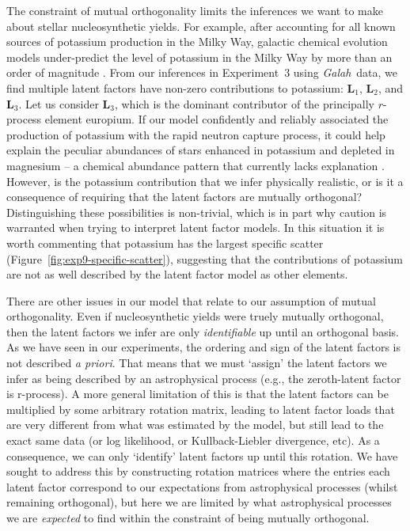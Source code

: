 \documentclass[twocolumn]{aastex62}
\newcommand{\project}[1]{\textsl{#1}}
\newcommand{\Galah}{\project{Galah}}
\newcommand{\factorloads}{\textbf{L}}
\begin{document}
The constraint of mutual orthogonality limits the inferences we want to make
about stellar nucleosynthetic yields. For example, after accounting for all
known sources of potassium production in the Milky Way, galactic chemical evolution
models under-predict the level of potassium in the Milky Way by more than an
order of magnitude \citep{Kobayashi:2006}. From our inferences in Experiment~3
using \Galah\ data, we find multiple latent factors have non-zero contributions
to potassium: $\factorloads_1$, $\factorloads_2$, and $\factorloads_3$. Let us consider
$\factorloads_3$, which is the dominant contributor of the principally $r$-process element europium. If our model confidently and
reliably associated the production of potassium with the rapid neutron capture
process, it could help explain the peculiar abundances of stars enhanced in
potassium and depleted in magnesium \citep{Mucciarelli:2012,Cohen:2012} -- a chemical
abundance pattern that currently lacks explanation \citep{Kemp:2018}.
However, is the potassium contribution that we infer physically realistic,
or is it a consequence of requiring that the latent factors are mutually
orthogonal? Distinguishing these possibilities is non-trivial, which is in
part why caution is warranted when trying to interpret latent factor models.
In this situation it is worth commenting that potassium has the largest specific
scatter (Figure~\ref{fig:exp9-specific-scatter}), suggesting that the contributions
of potassium are not as well described by the latent factor model as other
elements.


There are other issues in our model that relate to our assumption of mutual
orthogonality. Even if nucleosynthetic yields were truely mutually orthogonal,
then the latent factors we infer are only \emph{identifiable} up until an
orthogonal basis. As we have seen in our experiments, the ordering and sign 
of the latent factors is not described \emph{a priori}. That means that we
must `assign' the latent factors we infer as being described by an astrophysical
process (e.g., the zeroth-latent factor is r-process). A more general limitation
of this is that the latent factors can be multiplied by some arbitrary rotation
matrix, leading to latent factor loads that are very different from what was
estimated by the model, but still lead to the exact same data (or log likelihood,
or Kullback-Liebler divergence, etc). As a consequence, we can only `identify'
latent factors up until this rotation. We have sought to address this by constructing
rotation matrices where the entries each latent factor correspond to our expectations
from astrophysical processes (whilst remaining orthogonal), but here we are limited
by what astrophysical processes we are \emph{expected} to find within the constraint
of being mutually orthogonal.
\end{document}
